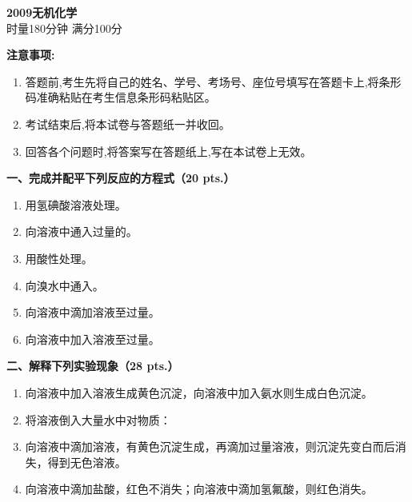 \begin{center}
    {\LARGE \textbf{2009无机化学}} \\[2ex]
    {\large 时量180分钟 \quad 满分100分}
\end{center}

\vspace{0.5cm}
\noindent\textbf{注意事项:}
\begin{enumerate}[label=\arabic*., parsep=0pt, itemsep=0pt]
    \item 答题前,考生先将自己的姓名、学号、考场号、座位号填写在答题卡上,将条形码准确粘贴在考生信息条形码粘贴区。
    \item 考试结束后,将本试卷与答题纸一并收回。
    \item 回答各个问题时,将答案写在答题纸上,写在本试卷上无效。
\end{enumerate}

\vspace{0.5cm}
\noindent\textbf{一、完成并配平下列反应的方程式（20 pts.）}

\begin{enumerate}[label=\arabic*., start=1, itemsep=1.5ex]
    \item 用氢碘酸溶液处理。
    \item 向溶液中通入过量的。
    \item 用酸性处理。
    \item 向溴水中通入。
    \item 向溶液中滴加溶液至过量。
    \item 向溶液中加入溶液至过量。
\end{enumerate}

\vspace{0.5cm}
\noindent\textbf{二、解释下列实验现象（28 pts.）}

\begin{enumerate}[label=\arabic*., start=7, itemsep=1.5ex]
    \item 向溶液中加入溶液生成黄色沉淀，向溶液中加入氨水则生成白色沉淀。
    \item 将溶液倒入大量水中对物质：
    \item 向溶液中滴加溶液，有黄色沉淀生成，再滴加过量溶液，则沉淀先变白而后消失，得到无色溶液。
    \item 向溶液中滴加盐酸，红色不消失；向溶液中滴加氢氟酸，则红色消失。
\end{enumerate}

